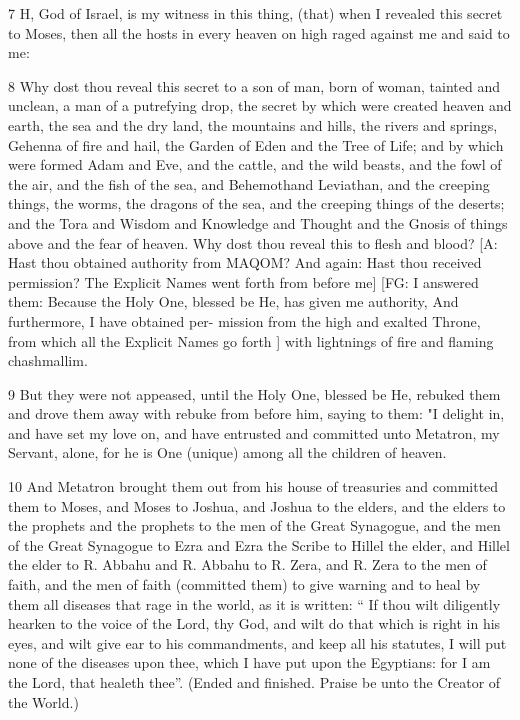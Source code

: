 \par 7 H, God of Israel, is my witness in this thing, (that) when I revealed this secret to Moses, then all the hosts in every heaven on high raged against me and said to me: 

\par 8 Why dost thou reveal this secret to a son of man, born of woman, tainted and unclean, a man of a putrefying drop, the secret by which were created heaven and earth, the sea and the dry land, the mountains and hills, the rivers and springs, Gehenna of fire and hail, the Garden of Eden and the Tree of Life; and by which were formed Adam and Eve, and the cattle, and the wild beasts, and the fowl of the air, and the fish of the sea, and Behemothand Leviathan, and the creeping things, the worms, the dragons of the sea, and the creeping things of the deserts; and the Tora and Wisdom and Knowledge and Thought and the Gnosis of things above and the fear of heaven. Why dost thou reveal this to flesh and blood? [A: Hast thou obtained authority from MAQOM? And again: Hast thou received permission? The Explicit Names went forth from before me] [FG: I answered them: Because the Holy One, blessed be He, has given me authority, And furthermore, I have obtained per- mission from the high and exalted Throne,  from which all the Explicit Names go  forth  ] with lightnings of fire and flaming chashmallim. 

\par 9 But they were not appeased, until the Holy One, blessed be He, rebuked them and drove them away with rebuke from before him, saying to them: "I delight in, and have set my love on, and have entrusted and committed unto Metatron, my Servant, alone, for he is One (unique) among all the children of heaven. 

\par 10 And Metatron brought them out from his house of treasuries and committed them to Moses, and Moses to Joshua, and Joshua to the elders, and the elders to the prophets and the prophets to the men of the Great Synagogue, and the men of the Great Synagogue to Ezra and Ezra the Scribe to Hillel the elder, and Hillel the elder to R. Abbahu and R. Abbahu to R. Zera, and R. Zera to the men of faith, and the men of faith (committed them) to give warning and to heal by them all diseases that rage in the world, as it is written: “ If thou wilt diligently hearken to the voice of the Lord, thy God, and wilt do that which is right in his eyes, and wilt give ear to his commandments, and keep all his statutes, I will put none of the diseases upon thee, which I have put upon the Egyptians: for I am the Lord, that healeth thee”. (Ended and finished. Praise be unto the Creator of the World.) 





